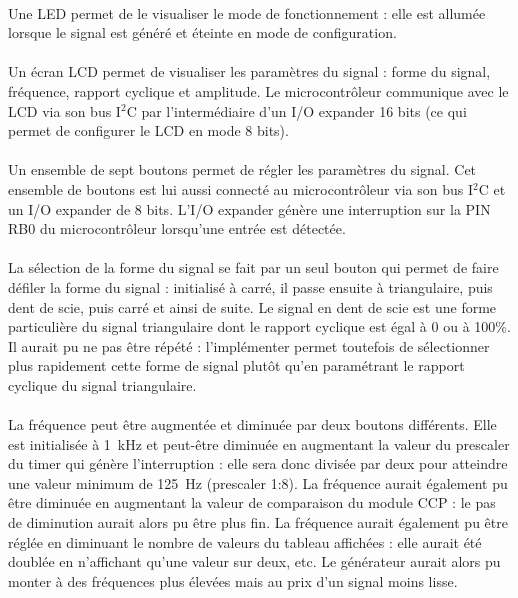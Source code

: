 \documentclass{article}
\begin{document}
    \paragraph{}
    Une LED permet de le visualiser le mode de fonctionnement : elle est allumée lorsque le signal est généré et éteinte en mode de configuration.

    \paragraph{}
    Un écran LCD permet de visualiser les paramètres du signal : forme du signal, fréquence, rapport cyclique et amplitude. Le microcontrôleur communique avec le LCD via son bus I$^2$C par l'intermédiaire d'un I/O expander 16 bits (ce qui permet de configurer le LCD en mode 8 bits).

    \paragraph{}
    Un ensemble de sept boutons permet de régler les paramètres du signal. Cet ensemble de boutons est lui aussi connecté au microcontrôleur via son bus I$^2$C et un I/O expander de 8 bits. L'I/O expander génère une interruption sur la PIN RB0 du microcontrôleur lorsqu'une entrée est détectée.

    \paragraph{}
    La sélection de la forme du signal se fait par un seul bouton qui permet de faire défiler la forme du signal : initialisé à carré, il passe ensuite à triangulaire, puis dent de scie, puis carré et ainsi de suite. Le signal en dent de scie est une forme particulière du signal triangulaire dont le rapport cyclique est égal à 0 ou à 100\%. Il aurait pu ne pas être répété : l'implémenter permet toutefois de sélectionner plus rapidement cette forme de signal plutôt qu'en paramétrant le rapport cyclique du signal triangulaire.

    \paragraph{}
    La fréquence peut être augmentée et diminuée par deux boutons différents. Elle est initialisée à \SI{1}{\kilo\hertz} et peut-être diminuée en augmentant la valeur du prescaler du timer qui génère l'interruption : elle sera donc divisée par deux pour atteindre une valeur minimum de \SI{125}{\hertz} (prescaler 1:8). La fréquence aurait également pu être diminuée en augmentant la valeur de comparaison du module CCP : le pas de diminution aurait alors pu être plus fin. La fréquence aurait également pu être réglée en diminuant le nombre de valeurs du tableau affichées : elle aurait été doublée en n'affichant qu'une valeur sur deux, etc. Le générateur aurait alors pu monter à des fréquences plus élevées mais au prix d'un signal moins lisse.
\end{document}
